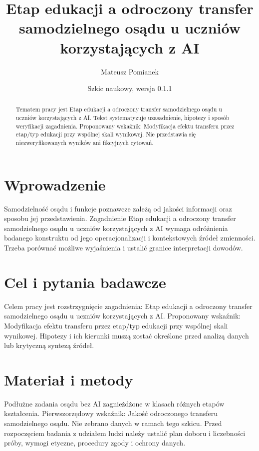 \documentclass[11pt,a4paper]{article}
\title{Etap edukacji a odroczony transfer samodzielnego osądu u uczniów korzystających z AI}
\author{Mateusz Pomianek}
\date{Szkic naukowy, wersja 0.1.1}
\begin{document}
\maketitle

\begin{abstract}

Tematem pracy jest Etap edukacji a odroczony transfer samodzielnego osądu u uczniów korzystających z AI. Tekst systematyzuje uzasadnienie, hipotezy i sposób weryfikacji zagadnienia. Proponowany wskaźnik: Modyfikacja efektu transferu przez etap/typ edukacji przy wspólnej skali wynikowej. Nie przedstawia się niezweryfikowanych wyników ani fikcyjnych cytowań.

\end{abstract}

\section{Wprowadzenie}

Samodzielność osądu i funkcje poznawcze zależą od jakości informacji oraz sposobu jej przedstawienia. Zagadnienie Etap edukacji a odroczony transfer samodzielnego osądu u uczniów korzystających z AI wymaga odróżnienia badanego konstruktu od jego operacjonalizacji i kontekstowych źródeł zmienności. Trzeba porównać możliwe wyjaśnienia i ustalić granice interpretacji dowodów.

\section{Cel i pytania badawcze}

Celem pracy jest rozstrzygnięcie zagadnienia: Etap edukacji a odroczony transfer samodzielnego osądu u uczniów korzystających z AI. Proponowany wskaźnik: Modyfikacja efektu transferu przez etap/typ edukacji przy wspólnej skali wynikowej. Hipotezy i ich kierunki muszą zostać określone przed analizą danych lub krytyczną syntezą źródeł.

\section{Materiał i metody}

Podłużne zadania osądu bez AI zagnieżdżone w klasach różnych etapów kształcenia. Pierwszorzędowy wskaźnik: Jakość odroczonego transferu samodzielnego osądu. Nie zebrano danych w ramach tego szkicu. Przed rozpoczęciem badania z udziałem ludzi należy ustalić plan doboru i liczebności próby, wymogi etyczne, procedury zgody i ochrony danych.
\end{document}
